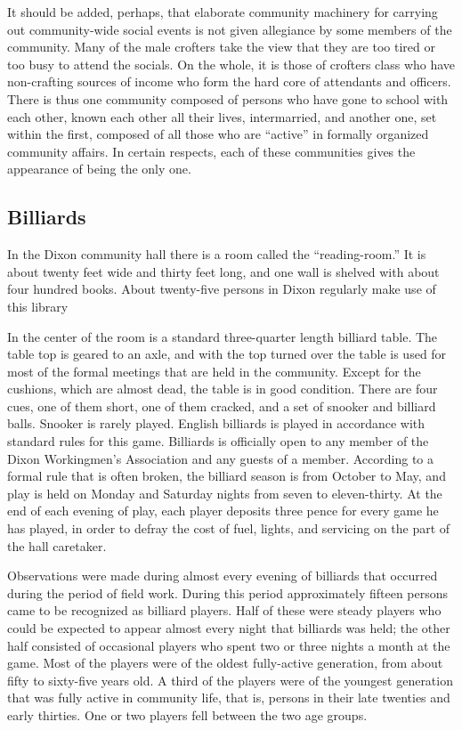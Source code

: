 \documentclass[twoside,symmetric,nobib,justified]{tufte-book}
\begin{document}
It should be added, perhaps, that elaborate community machinery for
carrying out community-wide social events is not given allegiance by
some members of the community. Many of the male crofters take the view
that they are too tired or too busy to attend the socials. On the whole,
it is those of crofters class who have non-crafting sources of income
who form the hard core of attendants and officers. There is thus one
community composed of persons who have gone to school with each other,
known each other all their lives, intermarried, and another one, set
within the first, composed of all those who are ``active'' in formally
organized community affairs. In certain respects, each of these
communities gives the appearance of being the only one.

\hypertarget{billiards}{%
\subsection{Billiards}\label{billiards}}

In the Dixon community hall there is a room called the ``reading-room.''
It is about twenty feet wide and thirty feet long, and one wall is
shelved with about four hundred books. About twenty-five persons in
Dixon regularly make use of this library

In the center of the room is a standard three-quarter length billiard
table. The table top is geared to an axle, and with the top turned over
the table is used for most of the formal meetings that are held in the
community. Except for the cushions, which are almost dead, the table is
in good condition. There are four cues, one of them short, one of them
cracked, and a set of snooker and billiard balls. Snooker is rarely
played. English billiards is played in accordance with standard rules
for this game. Billiards is officially open to any member of the Dixon
Workingmen's Association and any guests of a member. According to a
formal rule that is often broken, the billiard season is from October to
May, and play is held on Monday and Saturday nights from seven to
eleven-thirty. At the end of each evening of play, each player deposits
three pence for every game he has played, in order to defray the cost of
fuel, lights, and servicing on the part of the hall caretaker.

Observations were made during almost every evening of billiards that
occurred during the period of field work. During this period
approximately fifteen persons came to be recognized as billiard players.
Half of these were steady players who could be expected to appear almost
every night that billiards was held; the other half consisted of
occasional players who spent two or three nights a month at the game.
Most of the players were of the oldest fully-active generation, from
about fifty to sixty-five years old. A third of the players were of the
youngest generation that was fully active in community life, that is,
persons in their late twenties and early thirties. One or two players
fell between the two age groups.
\end{document}
